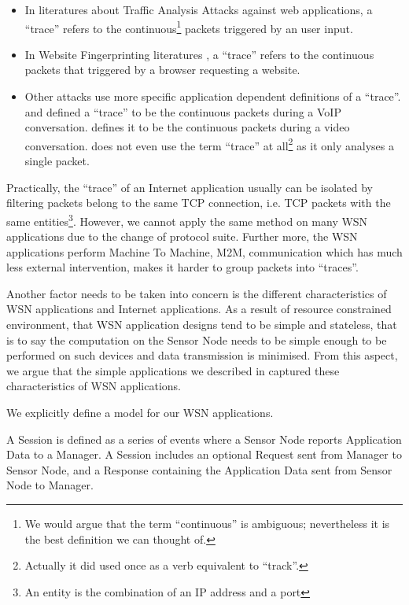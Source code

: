 \begin{itemize}
	\item In literatures about Traffic Analysis Attacks against web applications\cite{WebSideChannel}\cite{PinpointWeb}\cite{SearchAttack}, a ``trace'' refers to the continuous\footnote{We would argue that the term ``continuous'' is ambiguous; nevertheless it is the best definition we can thought of.} packets triggered by an user input.
	\item In Website Fingerprinting literatures\cite{WebsiteFingerprint} \cite{HClassifier} \cite{PClassifier} \cite{Peekaboo}, a ``trace'' refers to the continuous packets that triggered by a browser requesting a website.
	\item Other attacks use more specific application dependent definitions of a ``trace''. \cite{VoIPLanguage} and \cite{VoIPPhrases} defined a ``trace'' to be the continuous packets during a VoIP conversation. \cite{Video} defines it to be the continuous packets during a video conversation. \cite{AppleMessage} does not even use the term ``trace'' at all\footnote{Actually it did used once as a verb equivalent to ``track''.} as it only analyses a single packet.
\end{itemize}

Practically, the ``trace'' of an Internet application usually can be isolated by filtering packets belong to the same TCP connection, i.e. TCP packets with the same entities\footnote{An entity is the combination of an IP address and a port}. However, we cannot apply the same method on many WSN applications due to the change of protocol suite. Further more, the WSN applications perform Machine To Machine, M2M, communication which has much less external intervention, makes it harder to group packets into ``traces''.

Another factor needs to be taken into concern is the different characteristics of WSN applications and Internet applications. As a result of resource constrained environment, that WSN application designs tend to be simple and stateless, that is to say the computation on the Sensor Node needs to be simple enough to be performed on such devices and data transmission is minimised. From this aspect, we argue that the simple applications we described in  captured these characteristics of WSN applications.  

We explicitly define a model for our WSN applications.

\begin{definition} \label{Def: Session}
A Session is defined as a series of events where a Sensor Node reports Application Data to a Manager. A Session includes an optional Request sent from Manager to Sensor Node, and a Response containing the Application Data sent from Sensor Node to Manager.
\end{definition}

